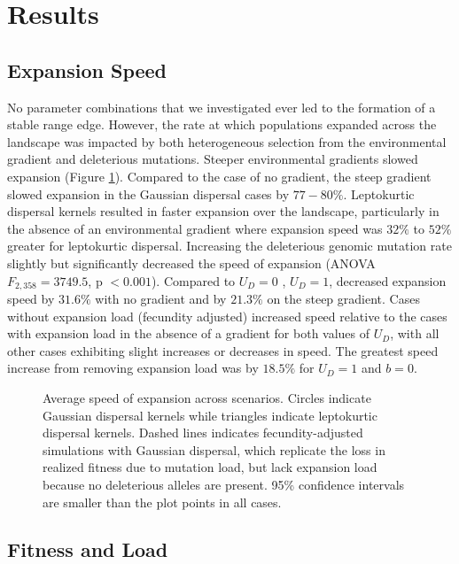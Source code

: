 \section{Results}

\subsection{Expansion Speed}
No parameter combinations that we investigated ever led to the formation of a stable range edge. However, the rate at which populations expanded across the landscape was impacted by both heterogeneous selection from the environmental gradient and deleterious mutations. Steeper environmental gradients slowed expansion (Figure \ref{fig:speed}). Compared to the case of no gradient, the steep gradient slowed expansion in the Gaussian dispersal cases by $77-80\%$. Leptokurtic dispersal kernels resulted in faster expansion over the landscape, particularly in the absence of an environmental gradient where expansion speed was $32\%$ to $52\%$ greater for leptokurtic dispersal. Increasing the deleterious genomic mutation rate slightly but significantly decreased the speed of expansion (ANOVA $F_{2,358} = 3749.5$,  p $< 0.001$). Compared to $U_D = 0$ , $U_D = 1$, decreased expansion speed by $31.6\%$ with no gradient and by $21.3\%$ on the steep gradient. Cases without expansion load (fecundity adjusted) increased speed relative to the cases with expansion load in the absence of a gradient for both values of $U_D$, with all other cases exhibiting slight increases or decreases in speed. The greatest speed increase from removing expansion load was by $18.5\%$ for $U_D = 1$ and $b = 0$.  

\begin{figure}[h]
\centering
{}
\caption[Average speed of expansion.]{Average speed of expansion across scenarios. Circles indicate Gaussian dispersal kernels while triangles indicate leptokurtic dispersal kernels. Dashed lines indicates fecundity-adjusted simulations with Gaussian dispersal, which replicate the loss in realized fitness due to mutation load, but lack expansion load because no deleterious alleles are present. 95\% confidence intervals are smaller than the plot points in all cases.}
\label{fig:speed}
\end{figure}




\subsection{Fitness and Load}

